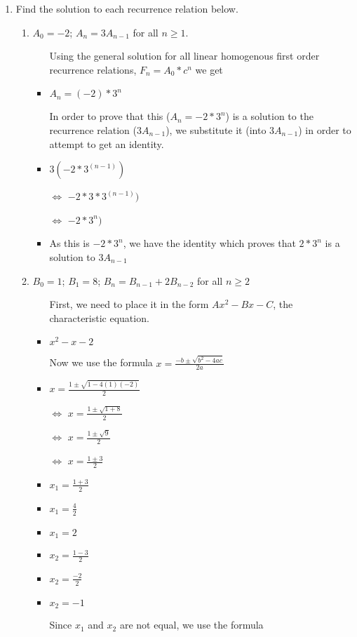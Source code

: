 \begin{enumerate}
\item Find the solution to each recurrence relation below.
  \begin{enumerate}
  \item $A_{0}=-2$; $A_{n}=3A_{n-1}$ for all $n\geq1$.
    \begin{itemize}
    \item [] Using the general solution for all linear homogenous first order recurrence relations, $F_{n}=A_{0}*c^{n}$ we get
    \item $A_{n}=(-2)*3^{n}$
    \item [] In order to prove that this ($A_{n}=-2*3^{n}$) is a solution to the recurrence relation ($3A_{n-1}$), we substitute it (into $3A_{n-1}$) in order to attempt to get an identity.
    \item $3(-2*3^{(n-1)})$
    \item [$\Leftrightarrow$]$-2*3*3^{(n-1)})$
    \item [$\Leftrightarrow$]$-2*3^{n})$
    \item As this is $-2*3^{n}$, we have the identity which proves that $2*3^{n}$ is a solution to $3A_{n-1}$
    \end{itemize}
  \item $B_{0}=1$; $B_{1}=8$; $B_{n}=B_{n-1}+2B_{n-2}$ for all $n\geq2$
    \begin{itemize}
    \item [] First, we need to place it in the form $Ax^{2}-Bx-C$, the characteristic equation.
    \item $x^{2}-x-2$
    \item [] Now we use the formula {\Large $x=\frac{-b \pm \sqrt{b^{2}-4ac}}{2a}$}
    \item {\Large $x=\frac{1 \pm \sqrt{1-4(1)(-2)}}{2}$}
    \item [$\Leftrightarrow$]{\Large $x=\frac{1 \pm \sqrt{1+8}}{2}$}
    \item [$\Leftrightarrow$]{\Large $x=\frac{1 \pm \sqrt{9}}{2}$}
    \item [$\Leftrightarrow$]{\Large $x=\frac{1 \pm 3}{2}$}
    \item {\Large $x_{1}=\frac{1+3}{2}$}
    \item {\Large $x_{1}=\frac{4}{2}$}
    \item {\Large $x_{1}=2$}
    \item {\Large $x_{2}=\frac{1-3}{2}$}
    \item {\Large $x_{2}=\frac{-2}{2}$}
    \item {\Large $x_{2}=-1$}
    \item [] Since $x_{1}$ and $x_{2}$ are not equal, we use the formula \\

\end{itemize}
\end{enumerate}
\end{enumerate}
